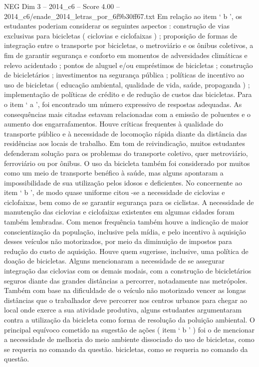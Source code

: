 \begin{textsample}{NEG Dim 3 – 2014\_c6 – Score 4.00 – 2014\_c6/enade\_2014\_letras\_por\_6f9b30ff67.txt}
Em relação ao item ‘ b ’, os estudantes poderiam considerar os seguintes aspectos : construção de vias exclusivas para bicicletas ( ciclovias e ciclofaixas ) ; proposição de formas de integração entre o transporte por bicicletas, o metroviário e os ônibus coletivos, a fim de garantir segurança e conforto em momentos de adversidades climáticas e relevo acidentado ; pontos de aluguel e/ou empréstimos de bicicletas ; construção de bicicletários ; investimentos na segurança pública ; políticas de incentivo ao uso de bicicletas ( educação ambiental, qualidade de vida, saúde, propaganda ) ; implementação de políticas de crédito e de redução de custos das bicicletas.
Para o item ‘ a ’, foi encontrado um número expressivo de respostas adequadas.
As consequências mais citadas estavam relacionadas com a emissão de poluentes e o aumento dos engarrafamentos.
Houve críticas frequentes à qualidade do transporte público e à necessidade de locomoção rápida diante da distância das residências aos locais de trabalho.
Em tom de reivindicação, muitos estudantes defenderam solução para os problemas do transporte coletivo, quer metroviário, ferroviário ou por ônibus.
O uso da bicicleta também foi considerado por muitos como um meio de transporte benéfico à saúde, mas alguns apontaram a impossibilidade de sua utilização pelos idosos e deficientes.
No concernente ao item ‘ b ’, de modo quase uniforme citou -se a necessidade de ciclovias e ciclofaixas, bem como de se garantir segurança para os ciclistas.
A necessidade de manutenção das ciclovias e ciclofaixas existentes em algumas cidades foram também lembradas.
Com menos frequência também houve a indicação de maior conscientização da população, inclusive pela mídia, e pelo incentivo à aquisição desses veículos não motorizados, por meio da diminuição de impostos para redução do custo de aquisição.
Houve quem sugerisse, inclusive, uma política de doação de bicicletas.
Alguns mencionaram a necessidade de se assegurar integração das ciclovias com os demais modais, com a construção de bicicletários seguros diante das grandes distâncias a percorrer, notadamente nas metrópoles.
Também com base na dificuldade de o veículo não motorizado vencer as longas distâncias que o trabalhador deve percorrer nos centros urbanos para chegar ao local onde exerce a sua atividade produtiva, alguns estudantes argumentaram contra a utilização da bicicleta como forma de resolução da poluição ambiental.
O principal equívoco cometido na sugestão de ações ( item ‘ b ’ ) foi o de mencionar a necessidade de melhoria do meio ambiente dissociado do uso de bicicletas, como se requeria no comando da questão. bicicletas, como se requeria no comando da questão.

\end{textsample}
